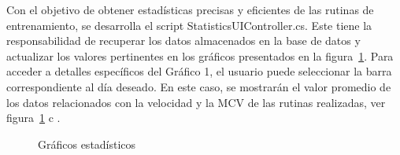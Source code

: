 Con el objetivo de obtener estadísticas precisas y eficientes de las rutinas de entrenamiento, se desarrolla el script StatisticsUIController.cs. Este tiene la responsabilidad de recuperar los datos almacenados en la base de datos y actualizar los valores pertinentes en los gráficos presentados en la figura~\ref{fig: statics-graphs}. Para acceder a detalles específicos del Gráfico 1, el usuario puede seleccionar la barra correspondiente al día deseado. En este caso, se mostrarán el valor promedio de los datos relacionados con la velocidad y la MCV de las rutinas realizadas, ver figura~\ref{fig: statics-graphs} c  .

\begin{figure}[ht]
    \centering

    \caption{Gráficos estadísticos}
    \label{fig: statics-graphs}
\end{figure}

